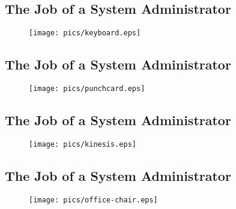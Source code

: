 \documentclass[xga]{xdvislides}
\begin{document}
\subsection{The Job of a System Administrator}
\vspace*{\fill}
\begin{figure}[hb]
	\begin{center}
		\texttt{[image: pics/keyboard.eps]} \\
	\end{center}
\end{figure}
\vspace*{\fill}

\subsection{The Job of a System Administrator}
\vspace*{\fill}
\begin{figure}[hb]
	\begin{center}
		\texttt{[image: pics/punchcard.eps]} \\
	\end{center}
\end{figure}
\vspace*{\fill}

\subsection{The Job of a System Administrator}
\vspace*{\fill}
\begin{figure}[hb]
	\begin{center}
		\texttt{[image: pics/kinesis.eps]} \\
	\end{center}
\end{figure}
\vspace*{\fill}

\subsection{The Job of a System Administrator}
\vspace*{\fill}
\begin{figure}[hb]
	\begin{center}
		\texttt{[image: pics/office-chair.eps]} \\
	\end{center}
\end{figure}
\vspace*{\fill}
\end{document}
